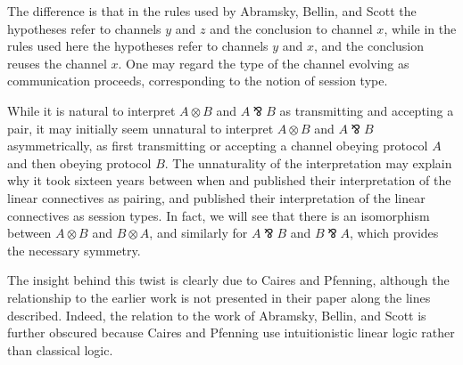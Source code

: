 \documentclass{jfp1}
\newcommand{\parr}{\mathbin{\bindnasrepma}}
\begin{document}
The difference is that in the rules used by Abramsky, Bellin, and
Scott the hypotheses refer to channels $y$ and $z$ and the conclusion
to channel $x$, while in the rules used here the hypotheses refer to
channels $y$ and $x$, and the conclusion reuses the channel $x$.  One
may regard the type of the channel evolving as communication proceeds,
corresponding to the notion of session type.

While it is natural to interpret $A \otimes B$ and $A \parr B$ as
transmitting and accepting a pair, it may initially seem unnatural to
interpret $A \otimes B$ and $A \parr B$ asymmetrically, as first
transmitting or accepting a channel obeying protocol $A$ and then
obeying protocol $B$.  The unnaturality of the interpretation may
explain why it took sixteen years between when \citet{Abramsky94} and
\citet{BellinScott94} published their interpretation of the linear
connectives as pairing, and \citet{CairesPfenning10} published their
interpretation of the linear connectives as session types.  In fact,
we will see that there is an isomorphism between $A \otimes B$ and $B
\otimes A$, and similarly for $A \parr B$ and $B \parr A$, which
provides the necessary symmetry.

The insight behind this twist is clearly due to Caires and Pfenning,
although the relationship to the earlier work is not presented in
their paper along the lines described.  Indeed, the relation to the
work of Abramsky, Bellin, and Scott is further obscured because Caires
and Pfenning use intuitionistic linear logic rather than classical
logic.
\end{document}
